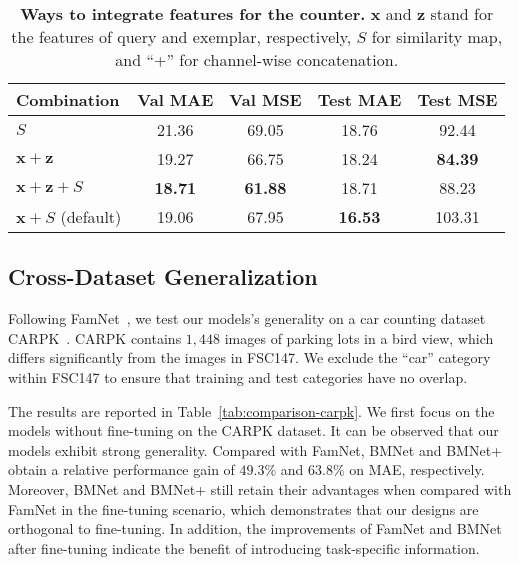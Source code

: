 \documentclass[10pt,twocolumn,letterpaper]{article}
\begin{document}
\begin{table}
  \centering
  \renewcommand{\arraystretch}{1.2}
  \addtolength{\tabcolsep}{0.25pt}
  \begin{tabular}{@{}lcccc@{}}
    \toprule
    \small{Combination}  & \small{Val MAE} & \small{Val MSE} & \small{Test MAE} & \small{Test MSE} \\ 
    \midrule
    \scriptsize{${S}$}                           & 21.36   & 69.05   & 18.76 & 92.44     \\
    \scriptsize{$\boldsymbol{x}+\boldsymbol{z}$}        & 19.27   & 66.75   & 18.24 & \textbf{84.39}     \\
    \scriptsize{$\boldsymbol{x}+\boldsymbol{z}+S$}  & \textbf{18.71}   & \textbf{61.88}   & 18.71    & 88.23  \\
    \scriptsize{$\boldsymbol{x}+S$} (default)          & 19.06   & 67.95   & \textbf{16.53} & 103.31  \\
    \bottomrule
    \end{tabular}
    \vspace{-10pt}
    \caption{\textbf{Ways to integrate features for the counter.} $\boldsymbol{x}$ and $\boldsymbol{z}$ stand for the features of query and exemplar, respectively, $S$ for similarity map, and ``+'' for channel-wise concatenation.}
    \label{tab:comparison-feature-combination}
    \vspace{-5pt}
\end{table}

\subsection{Cross-Dataset Generalization}
Following FamNet~\cite{famnet}, we test our models's generality on a car counting dataset CARPK~\cite{carpk}. CARPK contains $1,448$ images of parking lots in a bird view, which differs significantly from the images in FSC147. We exclude the ``car'' category within FSC147 to ensure that training and test categories have no overlap. 

The results are reported in Table~\ref{tab:comparison-carpk}. We first focus on the models without fine-tuning on the CARPK dataset. It can be observed that our models exhibit strong generality. Compared with FamNet, BMNet and BMNet+ obtain a relative performance gain of $49.3\%$ and $63.8\%$ on MAE, respectively. Moreover, BMNet and BMNet+ still retain their advantages when compared with FamNet in the fine-tuning scenario, which demonstrates that our designs are orthogonal to fine-tuning. In addition, the improvements of FamNet and BMNet after fine-tuning indicate the benefit of introducing task-specific information. 
\end{document}
